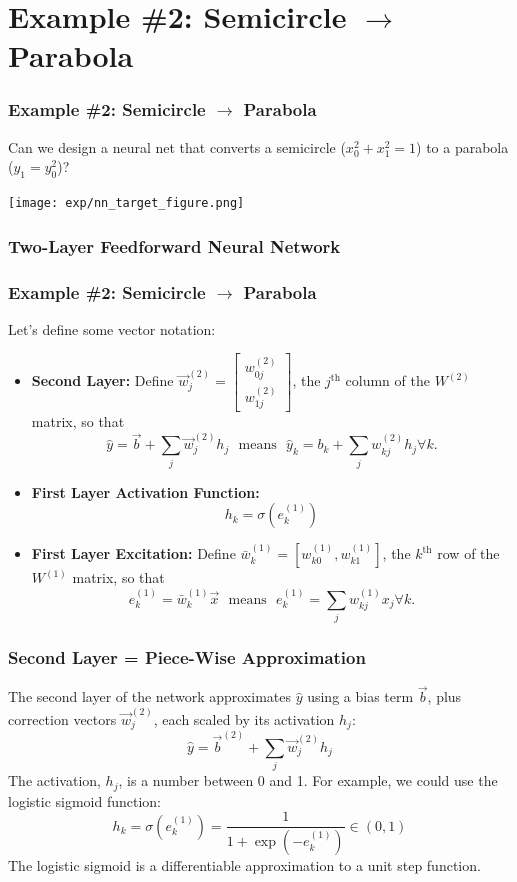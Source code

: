 \documentclass{beamer}
\begin{document}
\section[Example \#2]{Example \#2: Semicircle $\rightarrow$ Parabola}
\setcounter{subsection}{1}

\begin{frame}
  \frametitle{Example \#2: Semicircle $\rightarrow$ Parabola}

  Can we design a neural net that converts a semicircle
  ($x_0^2+x_1^2=1$) to a parabola ($y_1=y_0^2$)?
  \centerline{\texttt{[image: exp/nn\_target\_figure.png]}}
\end{frame}

\begin{frame}
  \frametitle{Two-Layer Feedforward Neural Network}
  \begin{small}\end{small}
\end{frame}

\begin{frame}
  \frametitle{Example \#2: Semicircle $\rightarrow$ Parabola}

  Let's define some vector notation:
  \begin{itemize}
  \item {\bf Second Layer:} Define
    $\vec{w}_j^{(2)}=\left[\begin{array}{c}w_{0j}^{(2)}\\w_{1j}^{(2)}\end{array}\right]$,
    the $j^{\textrm{th}}$ column of the $W^{(2)}$ matrix, so that
    \[
    \hat{y} = \vec{b} + \sum_j \vec{w}_{j}^{(2)} h_j~~~\mbox{means}~~~
    \hat{y}_k = b_k + \sum_j w_{kj}^{(2)} h_j\forall k.
    \]
  \item {\bf First Layer Activation Function:}
    \[
    h_k = \sigma\left(e_k^{(1)}\right)
    \]
  \item {\bf First Layer Excitation:} Define
    $\bar{w}_k^{(1)}=[w_{k0}^{(1)},w_{k1}^{(1)}]$, the
    $k^{\textrm{th}}$ row of the $W^{(1)}$ matrix, so that
    \[
    e_k^{(1)} = \bar{w}_{k}^{(1)} \vec{x}~~~\mbox{means}~~~
    e_k^{(1)} = \sum_j w_{kj}^{(1)} x_j\forall k.
    \]
  \end{itemize}
\end{frame}

\begin{frame}
  \frametitle{Second Layer = Piece-Wise Approximation}

  The second layer of the network approximates $\hat{y}$ using a bias term $\vec{b}$,
  plus correction vectors $\vec{w}_j^{(2)}$, each scaled by its activation $h_j$:
  \[
  \hat{y} = \vec{b}^{(2)} + \sum_j \vec{w}_{j}^{(2)} h_j
  \]
  The activation, $h_j$, is a number between 0 and 1.  For example, we could
  use the logistic sigmoid function:
  \[
  h_k = \sigma\left(e_k^{(1)}\right)=\frac{1}{1+\exp(-e_k^{(1)})}\in\left(0,1\right)
  \]
  The logistic sigmoid is a differentiable approximation to a unit step function.
\end{frame}
\end{document}
